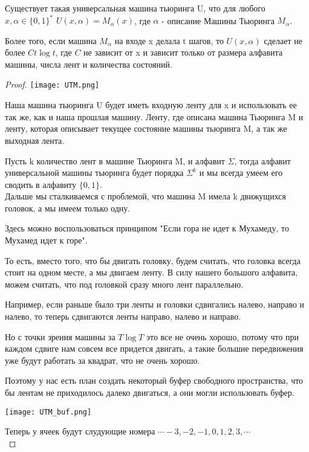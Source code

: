 \begin{theorem}
	Существует такая универсальная машина тьюринга U, что для любого $x, \alpha \in \{0, 1\}^*$
	$U(x, \alpha) = M_{\alpha}(x)$, где $\alpha$ - описание Машины Тьюринга $M_{\alpha}$.

	Более того, если машина $M_{\alpha}$ на входе x делала t шагов, 
	то $U(x, \alpha)$ сделает не более $Ct\log t$, где $C$ не зависит от 
	x и зависит только от размера алфавита машины, числа лент и количества состояний. 
\end{theorem}
\begin{proof}
	\texttt{[image: UTM.png]}

	Наша машина тьюринга U будет иметь входную ленту для x и использовать ее так же, 
	как и наша прошлая машину. Ленту, где описана машина Тьюринга M и ленту, которая описывает
	текущее состояние машины тьюринга M, а так же выходная лента.

	Пусть k количество лент в машине Тьюринга M, и алфавит $\Sigma$, 
	тогда алфавит универсальной машины тьюринга будет порядка $\Sigma^{k}$ и 
	мы всегда умеем его сводить в алфавиту $\{0, 1\}$.\\

	Дальше мы сталкиваемся с проблемой, что машина M имела k движущихся головок, 
	а мы имеем только одну. 

	Здесь можно воспользоваться принципом "Если гора не идет к Мухамеду, то Мухамед идет к горе".

	То есть, вместо того, что бы двигать головку, будем считать, что головка
	всегда стоит на одном месте, а мы двигаем ленту. В силу нашего большого алфавита, 
	можем считать, что под головкой сразу много лент параллельно. 

	Например, если раньше было три ленты и головки сдвигались налево, направо и налево, 
	то теперь сдвигаются ленты направо, налево и направо. 

	Но с точки зрения машины за $T \log T$ это все не очень хорошо, 
	потому что при каждом сдвиге нам совсем все придется двигать, а такие
	большие передвижения уже будут работать за квадрат, что не очень хорошо. 

	Поэтому у нас есть план создать некоторый буфер свободного пространства, 
	что бы лентам не приходилось далеко двигаться, а они могли использовать буфер. 

	\texttt{[image: UTM\_buf.png]}

	Теперь у ячеек будут слудующие номера $\cdots -3, -2, -1, 0, 1, 2, 3, \cdots$\\


\end{proof}
